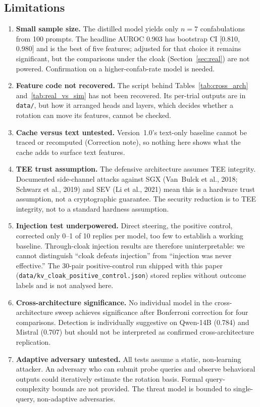\subsection{Limitations}

\begin{enumerate}
\item \textbf{Small sample size.} The distilled model yields only
$n=7$ confabulations from 100 prompts. The headline AUROC 0.903 has
bootstrap CI [0.810, 0.980] and is the best of five features; adjusted for
that choice it remains significant, but the comparisons under the cloak
(Section~\ref{sec:real}) are not powered. Confirmation on a
higher-confab-rate model is needed.

\item \textbf{Feature code not recovered.} The script behind
Tables~\ref{tab:cross_arch} and~\ref{tab:real_vs_sim} has not been
recovered. Its per-trial outputs are in \texttt{data/}, but how
it arranged heads and layers, which decides whether a rotation can move
its features, cannot be checked.

\item \textbf{Cache versus text untested.} Version~1.0's text-only
baseline cannot be traced or recomputed (Correction note), so nothing here
shows what the cache adds to surface text features.

\item \textbf{TEE trust assumption.} The defensive architecture assumes
TEE integrity. Documented side-channel attacks against SGX
(Van~Bulck et al., 2018; Schwarz et al., 2019) and SEV
(Li et al., 2021) mean this is a hardware trust assumption, not a
cryptographic guarantee. The security reduction is to TEE integrity,
not to a standard hardness assumption.

\item \textbf{Injection test underpowered.} Direct steering, the
positive control, corrected only 0--1 of 10 replies per model, too few to
establish a working baseline. Through-cloak injection results are
therefore uninterpretable: we cannot distinguish ``cloak defeats
injection'' from ``injection was never effective.'' The 30-pair
positive-control run shipped with this paper
(\nolinkurl{data/kv_cloak_positive_control.json}) stored replies without
outcome labels and is not analysed here.

\item \textbf{Cross-architecture significance.} No individual model in
the cross-architecture sweep achieves significance after Bonferroni
correction for four comparisons. Detection is individually suggestive on
Qwen-14B (0.784) and Mistral (0.707) but should not be interpreted as
confirmed cross-architecture replication.

\item \textbf{Adaptive adversary untested.} All tests assume a static,
non-learning attacker. An adversary who can submit probe queries and
observe behavioral outputs could iteratively estimate the rotation
basis. Formal query-complexity bounds are not provided. The threat model
is bounded to single-query, non-adaptive adversaries.
\end{enumerate}

